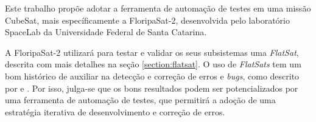 Este trabalho propõe adotar a ferramenta de automação de testes em uma missão CubeSat, mais específicamente a FloripaSat-2, desenvolvida
pelo laboratório SpaceLab da Universidade Federal de Santa Catarina.

A FloripaSat-2 utilizará para testar e validar os seus subsistemas uma \textit{FlatSat}, descrita com mais detalhes na seção
\ref{section:flatsat}. O uso de \textit{FlatSats} tem um bom histórico de auxiliar na detecção e correção de erros e \textit{bugs},
como descrito por \cite{aiv-cubesat} e \cite{marcelino2020-2}. Por isso, julga-se que os bons resultados podem ser potencializados
por uma ferramenta de automação de testes, que permitirá a adoção de uma estratégia iterativa de desenvolvimento e correção de erros.
